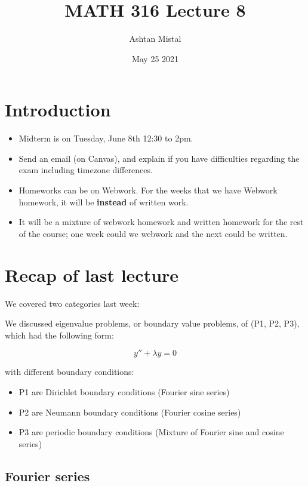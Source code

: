\documentclass{article}
\title{MATH 316 Lecture 8}
\author{Ashtan Mistal}
\date{May 25 2021}
\begin{document}
\ifstandalone
\maketitle
\fi

\graphicspath{{./Lecture08/}}

\section{Introduction}

\begin{itemize}
    \item Midterm is on Tuesday, June 8th 12:30 to 2pm. 
    \item Send an email (on Canvas), and explain if you have difficulties regarding the exam including timezone differences. 
    \item Homeworks can be on Webwork. For the weeks that we have Webwork homework, it will be \textbf{instead} of written work. 
    \item It will be a mixture of webwork homework and written homework for the rest of the course; one week could we webwork and the next could be written. 
\end{itemize}

\section{Recap of last lecture}

We covered two categories last week:

We discussed eigenvalue problems, or boundary value problems, of (P1, P2, P3), which had the following form:

$$y'' + \lambda y = 0$$

with different boundary conditions:

\begin{itemize}
    \item P1 are Dirichlet boundary conditions (Fourier sine series)
    \item P2 are Neumann boundary conditions (Fourier cosine series)
    \item P3 are periodic boundary conditions (Mixture of Fourier sine and cosine series)
\end{itemize}

\subsection{Fourier series}
\end{document}
